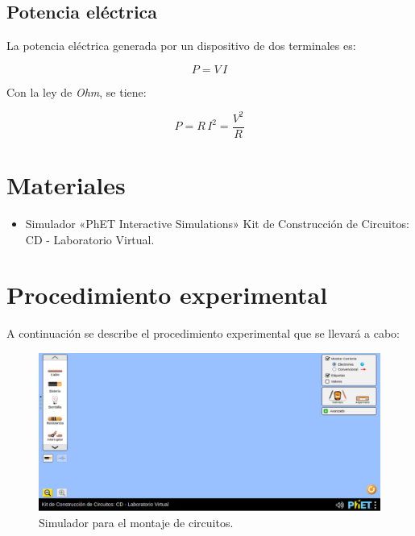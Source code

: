 \documentclass[letter,11pt]{article}
\begin{document}
\subsection{Potencia eléctrica}

La potencia eléctrica generada por un dispositivo de dos terminales es:

\begin{equation}
    P = V\, I
\label{potencia1}
\end{equation}

Con la ley de \emph{Ohm}, se tiene:

\begin{equation}
    P = R\,I^2 = \frac{V^2}{R}
\label{potencia2}
\end{equation}

\section{Materiales}

\begin{itemize}
\item Simulador «PhET Interactive Simulations» Kit de Construcción de Circuitos:
CD - Laboratorio Virtual.
\end{itemize}

\section{Procedimiento experimental}

A continuación se describe el procedimiento experimental que se llevará a cabo:

\begin{figure}[!h]
\centering
\includegraphics[scale=0.45]{resources/figura2.eps}
\caption{Simulador para el montaje de circuitos.}
\label{figura2}
\end{figure}
\end{document}
